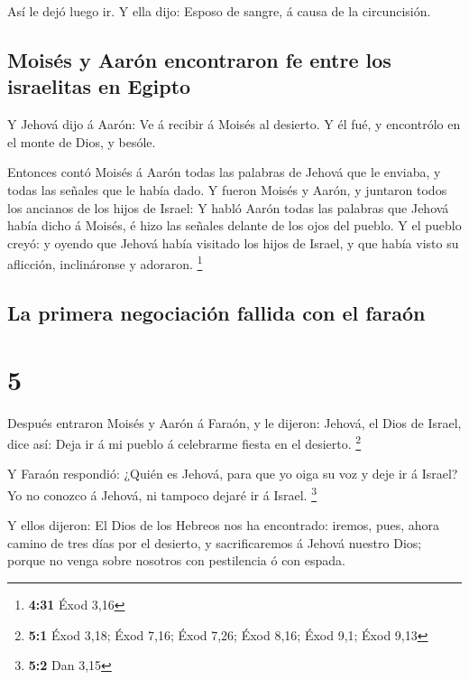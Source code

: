  Así le dejó luego ir. Y ella dijo: Esposo de sangre, á
causa de la circuncisión.

\hypertarget{moisuxe9s-y-aaruxf3n-encontraron-fe-entre-los-israelitas-en-egipto}{%
\subsection{Moisés y Aarón encontraron fe entre los israelitas en
Egipto}\label{moisuxe9s-y-aaruxf3n-encontraron-fe-entre-los-israelitas-en-egipto}}

 Y Jehová dijo á Aarón: Ve á recibir á Moisés al
desierto. Y él fué, y encontrólo en el monte de Dios, y besóle.

 Entonces contó Moisés á Aarón todas las palabras de
Jehová que le enviaba, y todas las señales que le había dado.
 Y fueron Moisés y Aarón, y juntaron todos los ancianos
de los hijos de Israel:  Y habló Aarón todas las palabras
que Jehová había dicho á Moisés, é hizo las señales delante de los ojos
del pueblo.  Y el pueblo creyó: y oyendo que Jehová había
visitado los hijos de Israel, y que había visto su aflicción,
inclináronse y adoraron. \footnote{\textbf{4:31} Éxod 3,16}

\hypertarget{la-primera-negociaciuxf3n-fallida-con-el-farauxf3n}{%
\subsection{La primera negociación fallida con el
faraón}\label{la-primera-negociaciuxf3n-fallida-con-el-farauxf3n}}

\hypertarget{section-4}{%
\section{5}\label{section-4}}

 Después entraron Moisés y Aarón á Faraón, y le dijeron:
Jehová, el Dios de Israel, dice así: Deja ir á mi pueblo á celebrarme
fiesta en el desierto. \footnote{\textbf{5:1} Éxod 3,18; Éxod 7,16; Éxod
  7,26; Éxod 8,16; Éxod 9,1; Éxod 9,13}

 Y Faraón respondió: ¿Quién es Jehová, para que yo oiga su
voz y deje ir á Israel? Yo no conozco á Jehová, ni tampoco dejaré ir á
Israel. \footnote{\textbf{5:2} Dan 3,15}

 Y ellos dijeron: El Dios de los Hebreos nos ha
encontrado: iremos, pues, ahora camino de tres días por el desierto, y
sacrificaremos á Jehová nuestro Dios; porque no venga sobre nosotros con
pestilencia ó con espada.

